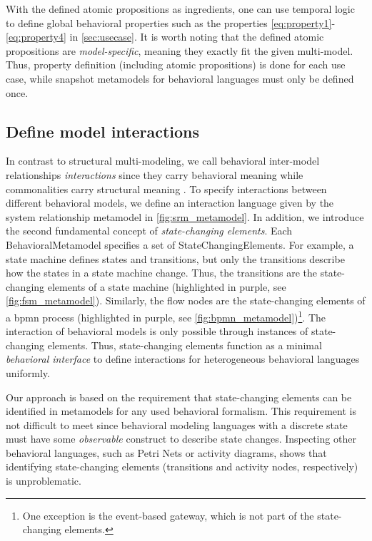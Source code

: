 \documentclass{jot}
\begin{document}
With the defined atomic propositions as ingredients, one can use temporal logic to define global behavioral properties such as the properties \eqref{eq:property1}-\eqref{eq:property4} in \autoref{sec:usecase}.
It is worth noting that the defined atomic propositions are \textit{model-specific}, meaning they exactly fit the given multi-model.
Thus, property definition (including atomic propositions) is done for each use case, while snapshot metamodels for behavioral languages must only be defined once.

\subsection{Define model interactions}
In contrast to structural multi-modeling, we call behavioral inter-model relationships \textit{interactions} since they carry behavioral meaning while commonalities carry structural meaning \cite{stunkelComprehensiveSystemsFormal2021, klareCommonalitiesPreservingConsistency2019}.
To specify interactions between different behavioral models, we define an interaction language given by the system relationship metamodel in \cref{fig:srm_metamodel}.
In addition, we introduce the second fundamental concept of \textit{state-changing elements}.
Each \textsf{BehavioralMetamodel} specifies a set of \textsf{StateChangingElement}s.
For example, a state machine defines states and transitions, but only the transitions describe how the states in a state machine change.
Thus, the transitions are the state-changing elements of a state machine (highlighted in purple, see \cref{fig:fsm_metamodel}).
Similarly, the flow nodes are the state-changing elements of a \gls*{bpmn} process (highlighted in purple, see \cref{fig:bpmn_metamodel})\footnote{One exception is the event-based gateway, which is not part of the state-changing elements.}.
The interaction of behavioral models is only possible through instances of state-changing elements.
Thus, state-changing elements function as a minimal \textit{behavioral interface} to define interactions for heterogeneous behavioral languages uniformly.

Our approach is based on the requirement that state-changing elements can be identified in metamodels for any used behavioral formalism.
This requirement is not difficult to meet since behavioral modeling languages with a discrete state must have some \textit{observable} construct to describe state changes.
Inspecting other behavioral languages, such as Petri Nets or activity diagrams, shows that identifying state-changing elements (transitions and activity nodes, respectively) is unproblematic. 
\end{document}
